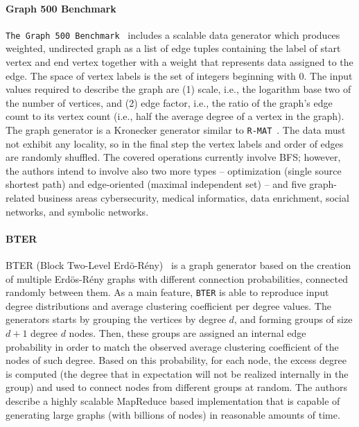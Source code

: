 \paragraph{Graph 500 Benchmark} \texttt{The Graph 500 Benchmark}~\cite{Graph500} includes
a scalable data generator which produces weighted, undirected graph as a list of
edge tuples containing the label of start vertex and end vertex together with a
weight that represents data assigned to the edge. The space of vertex  labels is
the set of integers beginning with 0. The input values required to describe the
graph are (1) scale, i.e., the logarithm base two of the number of vertices, and
(2) edge factor, i.e., the ratio of the graph's edge count to its vertex count
(i.e., half the average degree of a vertex in the graph). The graph generator is
a Kronecker generator similar to \texttt{R-MAT}~\cite{DBLP:conf/sdm/ChakrabartiZF04}. The data must not exhibit any locality,
so in the final step the vertex labels and order of edges are randomly shuffled.
The covered operations currently involve BFS; however, the authors intend to
involve also two more types -- optimization (single source shortest path) and
edge-oriented (maximal independent set) -- and five graph-related business areas
cybersecurity, medical informatics, data enrichment, social networks, and
symbolic networks.

\paragraph{BTER} BTER (Block Two-Level
Erd\"{o}-R\'{e}ny)~\cite{kolda2014scalable} is a graph generator based on the
creation of multiple Erd\"{o}s-R\'{e}ny graphs with different connection
probabilities, connected randomly between them. As a main feature, \texttt{BTER} is able
to reproduce input degree distributions and average clustering
coefficient per degree values. The generators starts by grouping the vertices
by degree $d$, and forming groups of size $d+1$ degree $d$ nodes. Then, these
groups are assigned an internal edge probability in order to match the observed
average clustering coefficient of the nodes of such degree. Based on this
probability, for each node, the excess degree is computed (the degree that in
expectation will not be realized internally in the group) and used to connect
nodes from different groups at random. The authors describe a highly scalable
MapReduce based implementation that is capable of generating large graphs (with
billions of nodes) in reasonable amounts of time.


